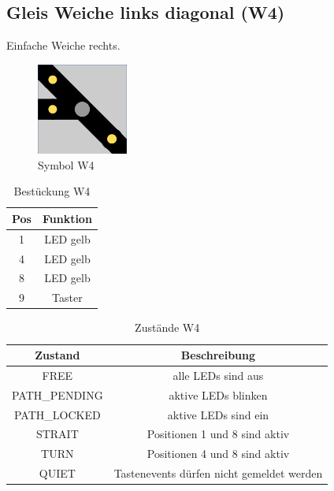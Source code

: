 \documentclass[10pt,a4paper]{article}
\begin{document}
\subsection{Gleis Weiche links diagonal (W4)}
Einfache Weiche rechts.
\begin{figure}[hbtp]
\centering
\includegraphics[width=3cm]{../folien/w4.png}
\caption{Symbol W4}
\end{figure}
\begin{table}[h!]
\centering
\begin{tabular}{c|c}
\textbf{Pos} & \textbf{Funktion} \\ \hline
1 & LED gelb \\
4 & LED gelb \\
8 & LED gelb \\
9 & Taster
\end{tabular}
\caption{Bestückung W4}
\end{table}
\begin{table}[h!]
\centering
\begin{tabular}{c|c}
\textbf{Zustand} & \textbf{Beschreibung} \\ \hline
FREE & alle LEDs sind aus \\
PATH\_PENDING & aktive LEDs blinken \\
PATH\_LOCKED & aktive LEDs sind ein \\
STRAIT & Positionen 1 und 8 sind aktiv \\
TURN & Positionen 4 und 8 sind aktiv\\
QUIET & Tastenevents dürfen nicht gemeldet werden
\end{tabular}
\caption{Zustände W4}
\end{table}
\end{document}
